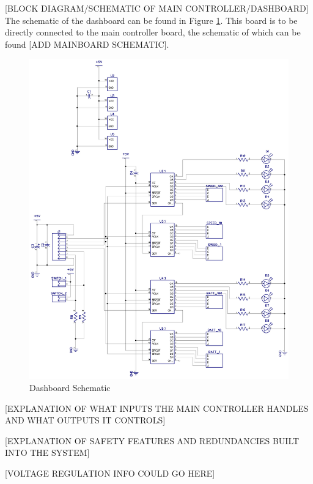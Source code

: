 \documentclass[10pt,a4paper]{article}
\begin{document}
[BLOCK DIAGRAM/SCHEMATIC OF MAIN CONTROLLER/DASHBOARD]
The schematic of the dashboard can be found in Figure \ref{fig:dashboard_schematic}. This board is to be directly connected to the main controller board, the schematic of which can be found [ADD MAINBOARD SCHEMATIC].
\begin{figure}[H]%
\includegraphics[width=\columnwidth]{dashboard_schematic.jpg}%
\caption{Dashboard Schematic}%
\label{fig:dashboard_schematic}%
\end{figure}

[EXPLANATION OF WHAT INPUTS THE MAIN CONTROLLER HANDLES AND WHAT OUTPUTS IT CONTROLS]

[EXPLANATION OF SAFETY FEATURES AND REDUNDANCIES BUILT INTO THE SYSTEM]

[VOLTAGE REGULATION INFO COULD GO HERE]
\end{document}

